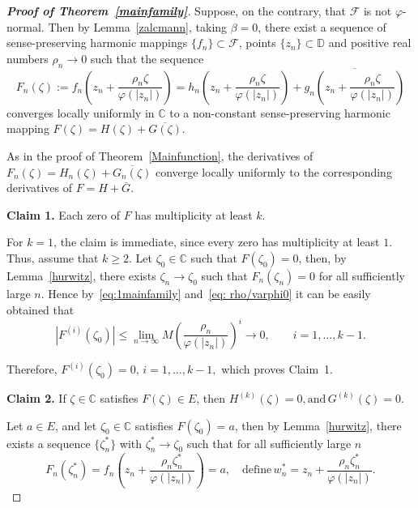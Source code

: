 \documentclass[10pt,a4paper]{amsart}
\numberwithin{equation}{section}
\begin{document}
\begin{proof}[\bf{Proof of Theorem~\ref{mainfamily}}]
  Suppose, on the contrary, that $\mathcal{F}$ is not
$\varphi$-normal. Then by Lemma~\ref{zalcmann}, taking 
$\beta=0$, there exist
 a sequence of sense-preserving harmonic mappings 
 $\{f_n\} \subset \mathcal{F}$, points
$\{z_n\}\subset\mathbb{D}$ and positive real numbers
$\rho_n\to0$ such that the sequence
\begin{equation}\label{eq: zalcfamily}
F_n(\zeta)
:=
f_n\!\left(
z_n+\frac{\rho_n\zeta}{\varphi(|z_n|)}
\right)
=
h_n\!\left(
z_n+\frac{\rho_n\zeta}{\varphi(|z_n|)}
\right)
+
\overline{
g_n\!\left(
z_n+\frac{\rho_n\zeta}{\varphi(|z_n|)}
\right)
}
\end{equation}
converges locally uniformly in $\mathbb{C}$ to 
a non-constant
 sense-preserving harmonic mapping $
 F(\zeta)=H(\zeta)+\overline{G(\zeta)}.
$\smallskip

As in the proof of Theorem~\ref{Mainfunction}, the derivatives
of $F_n(\zeta)=H_n(\zeta)+\overline{G_n(\zeta)}$ converge locally 
uniformly to the corresponding 
derivatives of $F=H+\overline{G}$.

\noindent \textbf{Claim 1.}
Each zero of $F$ has multiplicity at least $k$.\smallskip

For $k=1$, the claim is immediate, since every zero has multiplicity at least $1$. Thus, assume that $k\ge2$.
Let $\zeta_0\in\mathbb C$ such that $F(\zeta_0)=0$,
then, by Lemma~\ref{hurwitz},  there exists
$\zeta_n\to\zeta_0$ such that $F_n(\zeta_n)=0$ for all sufficiently large $n$. 
Hence by~\eqref{eq:1mainfamily} and~\eqref{eq: rho/varphi0} it can be easily
obtained that
\[
|F^{(i)}(\zeta_0)|
\le
\lim_{n\to\infty}
M
\left(
\frac{\rho_n}{\varphi(|z_n|)}
\right)^i
\longrightarrow 0,
\qquad
i=1,\ldots,k-1.
\]

Therefore,
$
F^{(i)}(\zeta_0)=0,
\,
i=1,\ldots,k-1,
$
which proves Claim~1.\smallskip

\noindent
\textbf{Claim 2.}
If $\zeta \in \mathbb{C}$ satisfies $F(\zeta)\in E$, then
$
H^{(k)}(\zeta)=0, \text{and}\, 
G^{(k)}(\zeta)=0.
$\smallskip

Let $a\in E$, and let $\zeta_{0}\in \mathbb{C}$ satisfies
$
F(\zeta_{0})=a
$, then
by Lemma~\ref{hurwitz}, there exists a 
sequence $\{\zeta_n^*\}$ with
$\zeta_n^*\to\zeta_0$ such that for all sufficiently large $n$
\[
F_n(\zeta_n^*)
=
f_n\!\left(
z_n+\frac{\rho_n\zeta_n^*}{\varphi(|z_n|)}
\right)
=a, \quad \text{define} \, w_n^*
=
z_n+\frac{\rho_n\zeta_n^*}{\varphi(|z_n|)}.
\]


\end{proof}
\end{document}
